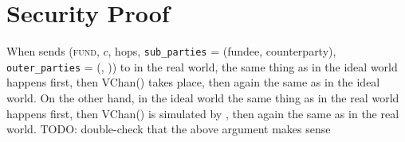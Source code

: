 \section{Security Proof}
  When \environment sends (\textsc{fund}, $c$, hops, \texttt{sub\_parties} =
  (fundee, counterparty), \texttt{outer\_parties} = (\charlie, \dave)) to \alice
  in the real world, the same thing as in the ideal world happens first, then
  VChan() takes place, then again the same as in the ideal world. On the other
  hand, in the ideal world the same thing as in the real world happens first,
  then VChan() is simulated by \simulator, then again the same as in the real
  world. TODO: double-check that the above argument makes sense
